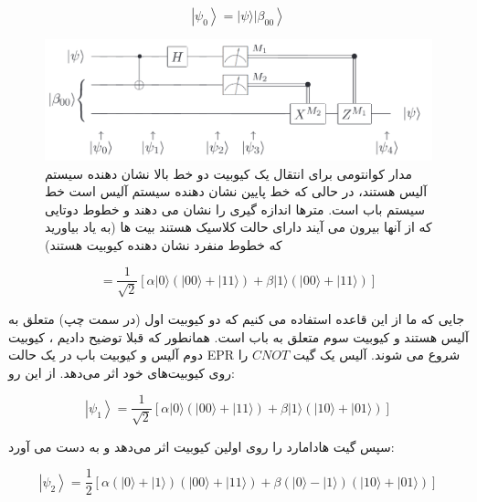 \documentclass{book}
\begin{document}
\begin{center}
	\begin{equation}\label{psi before spooky action}
		\left.\left|\psi_0\right\rangle=\vert \psi\rangle \vert \beta_{00}\right\rangle
	\end{equation}
\end{center}


\begin{figure}[h]
\centering
\includegraphics[width=6in]{spooky action.png}
\caption{مدار کوانتومی برای انتقال یک کیوبیت دو خط بالا نشان دهنده سیستم آلیس هستند، در حالی که خط پایین نشان دهنده سیستم آلیس است		خط سیستم باب است. مترها اندازه گیری را نشان می دهند و خطوط دوتایی که از آنها بیرون می آیند دارای حالت کلاسیک هستند
		بیت ها (به یاد بیاورید که خطوط منفرد نشان دهنده کیوبیت هستند)}
\end{figure}

\begin{center}
	\begin{equation}\label{wide version spooky psi}
		=\frac{1}{\sqrt{2}}[\alpha|0\rangle(|00\rangle+|11\rangle)+\beta|1\rangle(|00\rangle+|11\rangle)]
	\end{equation}
\end{center}

جایی که ما از این قاعده استفاده می کنیم که دو کیوبیت اول (در سمت چپ) متعلق به آلیس هستند و
کیوبیت سوم متعلق به باب است. همانطور که قبلا توضیح دادیم ، کیوبیت دوم آلیس و کیوبیت باب
در یک حالت EPR شروع می شوند. آلیس یک گیت $CNOT$ را روی کیوبیت‌های خود اثر می‌دهد. از این رو:


\begin{center}
	\begin{equation}\label{Teleport psi1}
		\left|\psi_1\right\rangle=\frac{1}{\sqrt{2}}[\alpha|0\rangle(|00\rangle+|11\rangle)+\beta|1\rangle(|10\rangle+|01\rangle)]
	\end{equation}
\end{center}

سپس گیت هادامارد را روی اولین کیوبیت اثر می‌دهد و به دست می آورد:

\begin{center}
	\begin{equation}\label{Teleport psi2}
		\left|\psi_2\right\rangle=\frac{1}{2}[\alpha(|0\rangle+|1\rangle)(|00\rangle+|11\rangle)+\beta(|0\rangle-|1\rangle)(|10\rangle+|01\rangle)]
	\end{equation}
\end{center}
\end{document}
